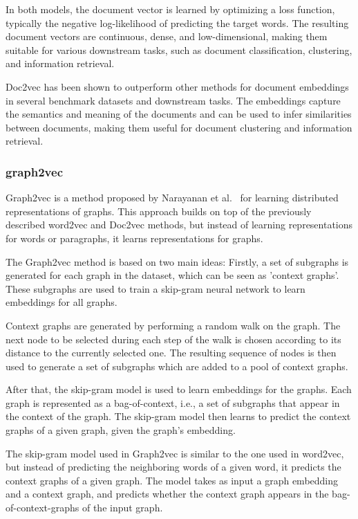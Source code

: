 In both models, the document vector is learned by optimizing a loss function, typically the negative log-likelihood of predicting the target words. The resulting document vectors are continuous, dense, and low-dimensional, making them suitable for various downstream tasks, such as document classification, clustering, and information retrieval.

Doc2vec has been shown to outperform other methods for document embeddings in several benchmark datasets and downstream tasks. The embeddings capture the semantics and meaning of the documents and can be used to infer similarities between documents, making them useful for document clustering and information retrieval.

\subsubsection{graph2vec}
Graph2vec is a method proposed by Narayanan et al.~\cite{2017graph2vec} for learning distributed representations of graphs. This approach builds on top of the previously described word2vec and Doc2vec methods, but instead of learning representations for words or paragraphs, it learns representations for graphs.

The Graph2vec method is based on two main ideas: Firstly, a set of subgraphs is generated for each graph in the dataset, which can be seen as 'context graphs'. These subgraphs are used to train a skip-gram neural network to learn embeddings for all graphs.

Context graphs are generated by performing a random walk on the graph. The next node to be selected during each step of the walk is chosen according to its distance to the currently selected one. The resulting sequence of nodes is then used to generate a set of subgraphs which are added to a pool of context graphs.

After that, the skip-gram model is used to learn embeddings for the graphs. Each graph is represented as a bag-of-context, i.e., a set of subgraphs that appear in the context of the graph. The skip-gram model then learns to predict the context graphs of a given graph, given the graph's embedding.

The skip-gram model used in Graph2vec is similar to the one used in word2vec, but instead of predicting the neighboring words of a given word, it predicts the context graphs of a given graph. The model takes as input a graph embedding and a context graph, and predicts whether the context graph appears in the bag-of-context-graphs of the input graph.

